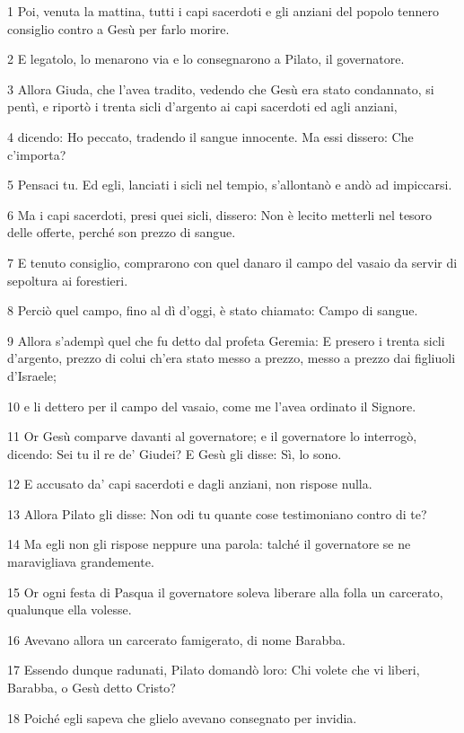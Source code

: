 \par 1 Poi, venuta la mattina, tutti i capi sacerdoti e gli anziani del popolo tennero consiglio contro a Gesù per farlo morire.
\par 2 E legatolo, lo menarono via e lo consegnarono a Pilato, il governatore.
\par 3 Allora Giuda, che l'avea tradito, vedendo che Gesù era stato condannato, si pentì, e riportò i trenta sicli d'argento ai capi sacerdoti ed agli anziani,
\par 4 dicendo: Ho peccato, tradendo il sangue innocente. Ma essi dissero: Che c'importa?
\par 5 Pensaci tu. Ed egli, lanciati i sicli nel tempio, s'allontanò e andò ad impiccarsi.
\par 6 Ma i capi sacerdoti, presi quei sicli, dissero: Non è lecito metterli nel tesoro delle offerte, perché son prezzo di sangue.
\par 7 E tenuto consiglio, comprarono con quel danaro il campo del vasaio da servir di sepoltura ai forestieri.
\par 8 Perciò quel campo, fino al dì d'oggi, è stato chiamato: Campo di sangue.
\par 9 Allora s'adempì quel che fu detto dal profeta Geremia: E presero i trenta sicli d'argento, prezzo di colui ch'era stato messo a prezzo, messo a prezzo dai figliuoli d'Israele;
\par 10 e li dettero per il campo del vasaio, come me l'avea ordinato il Signore.
\par 11 Or Gesù comparve davanti al governatore; e il governatore lo interrogò, dicendo: Sei tu il re de' Giudei? E Gesù gli disse: Sì, lo sono.
\par 12 E accusato da' capi sacerdoti e dagli anziani, non rispose nulla.
\par 13 Allora Pilato gli disse: Non odi tu quante cose testimoniano contro di te?
\par 14 Ma egli non gli rispose neppure una parola: talché il governatore se ne maravigliava grandemente.
\par 15 Or ogni festa di Pasqua il governatore soleva liberare alla folla un carcerato, qualunque ella volesse.
\par 16 Avevano allora un carcerato famigerato, di nome Barabba.
\par 17 Essendo dunque radunati, Pilato domandò loro: Chi volete che vi liberi, Barabba, o Gesù detto Cristo?
\par 18 Poiché egli sapeva che glielo avevano consegnato per invidia.
